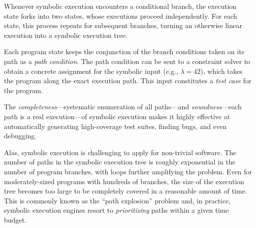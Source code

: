 Whenever symbolic execution encounters a conditional branch, the execution state forks into two states, whose executions proceed independently.  For each state, this process repeats for subsequent branches, turning an otherwise linear execution into a symbolic execution tree.



Each program state keeps the conjunction of the branch conditions taken on its path as a \emph{path condition}.
%
The path condition can be sent to a constraint solver to obtain a concrete assignment for the symbolic input (e.g., $\lambda = 42$), which takes the program along the exact execution path.  This input constitutes a \emph{test case} for the program.

The \emph{completeness}---systematic enumeration of all paths---and \emph{soundness}---each path is a real execution---of symbolic execution makes it highly effective at automatically generating high-coverage test suites, finding bugs, and even debugging.





Alas, symbolic execution is challenging to apply for non-trivial software.  The number of paths in the symbolic execution tree is roughly exponential in the number of program branches, with loops further amplifying the problem.  Even for moderately-sized programs with hundreds of branches, the size of the execution tree becomes too large to be completely covered in a reasonable amount of time.
%
This is commonly known as the ``path explosion'' problem and, in practice, symbolic execution engines resort to \emph{prioritizing} paths within a given time budget.


